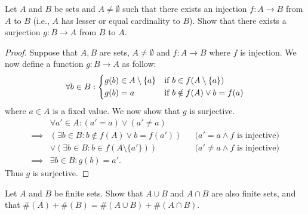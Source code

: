 \begin{ex}\label{ex:3.6.8}
  Let \(A\) and \(B\) be sets and \(A \neq \emptyset\) such that there exists an injection \(f : A \to B\) from \(A\) to \(B\) (i.e., \(A\) has lesser or equal cardinality to \(B\)).
  Show that there exists a surjection \(g : B \to A\) from \(B\) to \(A\).
\end{ex}

\begin{proof}
  Suppose that \(A, B\) are sets, \(A \neq \emptyset\) and \(f : A \to B\) where \(f\) is injection.
  We now define a function \(g : B \to A\) as follow:
  \[
    \forall b \in B : \begin{dcases}
      g(b) \in A \setminus \{a\} & \text{if } b \in f(A \setminus \{a\})  \\
      g(b) = a                   & \text{if } b \notin f(A) \lor b = f(a)
    \end{dcases}
  \]
  where \(a \in A\) is a fixed value.
  We now show that \(g\) is surjective.
  \begin{align*}
             & \forall a' \in A : (a' = a) \lor (a' \neq a)                                                          \\
    \implies & (\exists b \in B : b \notin f(A) \lor b = f(a'))     &  & \text{(\(a' = a \land f\) is injective)}    \\
             & \lor (\exists b \in B : b \in f(A \setminus \{a'\})) &  & \text{(\(a' \neq a \land f\) is injective)} \\
    \implies & \exists b \in B : g(b) = a'.
  \end{align*}
  Thus \(g\) is surjective.
\end{proof}

\begin{ex}\label{ex:3.6.9}
  Let \(A\) and \(B\) be finite sets.
  Show that \(A \cup B\) and \(A \cap B\) are also finite sets, and that \(\#(A) + \#(B) = \#(A \cup B) + \#(A \cap B)\).
\end{ex}

